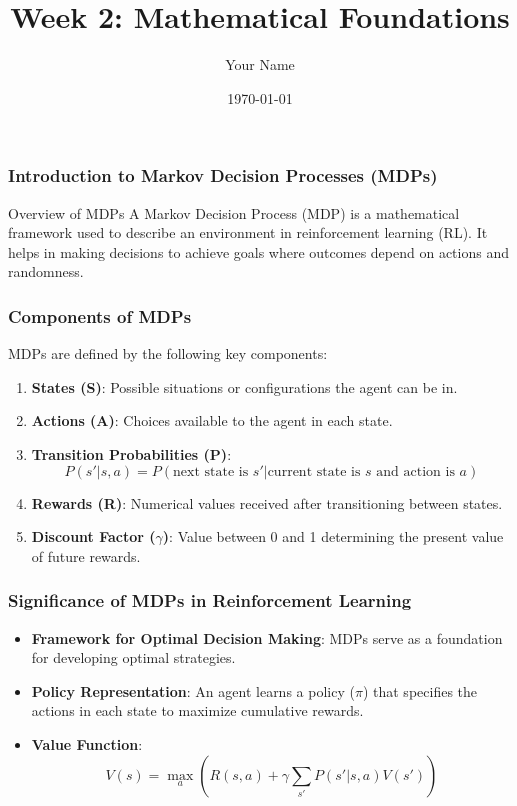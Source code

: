 \documentclass{beamer}
\title{Week 2: Mathematical Foundations}
\author{Your Name}
\institute{Your Institution}
\date{\today}
\begin{document}
\frame{\titlepage}

\begin{frame}[fragile]
    \frametitle{Introduction to Markov Decision Processes (MDPs)}
    \begin{block}{Overview of MDPs}
        A Markov Decision Process (MDP) is a mathematical framework used to describe an environment in reinforcement learning (RL). It helps in making decisions to achieve goals where outcomes depend on actions and randomness.
    \end{block}
\end{frame}

\begin{frame}[fragile]
    \frametitle{Components of MDPs}
    MDPs are defined by the following key components:
    \begin{enumerate}
        \item \textbf{States (S)}: Possible situations or configurations the agent can be in.
        \item \textbf{Actions (A)}: Choices available to the agent in each state.
        \item \textbf{Transition Probabilities (P)}:
        \[
        P(s' | s, a) = P(\text{next state is } s' | \text{current state is } s \text{ and action is } a)
        \]
        \item \textbf{Rewards (R)}: Numerical values received after transitioning between states.
        \item \textbf{Discount Factor ($\gamma$)}: Value between 0 and 1 determining the present value of future rewards.
    \end{enumerate}
\end{frame}

\begin{frame}[fragile]
    \frametitle{Significance of MDPs in Reinforcement Learning}
    \begin{itemize}
        \item \textbf{Framework for Optimal Decision Making}: MDPs serve as a foundation for developing optimal strategies.
        \item \textbf{Policy Representation}: An agent learns a policy ($\pi$) that specifies the actions in each state to maximize cumulative rewards.
        \item \textbf{Value Function}:
        \[
        V(s) = \max_a \left( R(s, a) + \gamma \sum_{s'} P(s' | s, a)V(s') \right)
        \]
    \end{itemize}
\end{frame}
\end{document}
